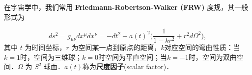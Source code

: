 
在宇宙学中，我们常用 \textbf{Friedmann-Robertson-Walker (FRW)} 度规，其一般形式为

\begin{equation}
ds^2=g_{\mu\nu}dx^{\mu}dx^{\nu}=-dt^2+a(t)^2\Big(\frac{1}{1-kr^2}+r^2 d\Omega^2\Big),
\end{equation}
其中 $t$ 为时间坐标，$r$ 为空间某一点到原点的距离，$k$对应空间的弯曲性质：当$k=1$时，空间为三维球；$k=0$时空间为平直空间；当$k=-1$时，空间为双曲空间．$\Omega$ 为 $S^2$ 球面．$a(t)$称为\textbf{尺度因子}(scalar factor)．

